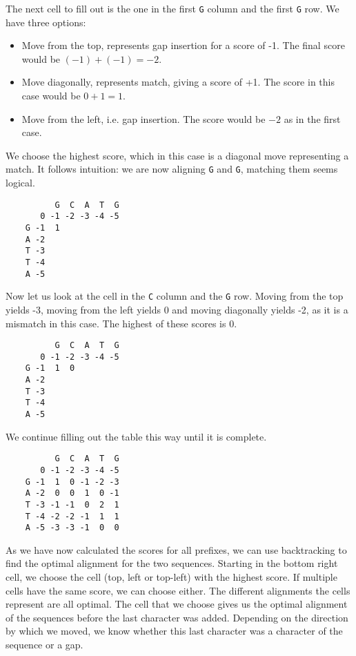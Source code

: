 The next cell to fill out is the one in the first \verb|G| column and the first \verb|G| row. We have three options:

\begin{itemize}
    \item Move from the top, represents gap insertion for a score of -1. The final score would be $(-1) + (-1) = -2$.
    \item Move diagonally, represents match, giving a score of +1. The score in this case would be $0 + 1 = 1$.
    \item Move from the left, i.e. gap insertion. The score would be $-2$ as in the first case.
\end{itemize}

We choose the highest score, which in this case is a diagonal move representing a match. It follows intuition: we are now aligning
\verb|G| and \verb|G|, matching them seems logical.

\begin{verbatim}
          G  C  A  T  G
       0 -1 -2 -3 -4 -5
    G -1  1
    A -2
    T -3
    T -4
    A -5
\end{verbatim}

Now let us look at the cell in the \verb|C| column and the \verb|G| row. Moving from the top yields -3, moving from the left yields
0 and moving diagonally yields -2, as it is a mismatch in this case. The highest of these scores is 0.

\begin{verbatim}
          G  C  A  T  G
       0 -1 -2 -3 -4 -5
    G -1  1  0
    A -2
    T -3
    T -4
    A -5
\end{verbatim}

We continue filling out the table this way until it is complete.

\begin{verbatim}
          G  C  A  T  G
       0 -1 -2 -3 -4 -5
    G -1  1  0 -1 -2 -3
    A -2  0  0  1  0 -1
    T -3 -1 -1  0  2  1
    T -4 -2 -2 -1  1  1
    A -5 -3 -3 -1  0  0
\end{verbatim}

As we have now calculated the scores for all prefixes, we can use backtracking to find the optimal alignment for the two sequences.
Starting in the bottom right cell, we choose the cell (top, left or top-left) with the highest score. If multiple cells have the same score, we can 
choose either. The different alignments the cells represent are all optimal. The cell that we choose gives us the optimal alignment
of the sequences before the last character was added. Depending on the direction by which we moved, we know whether this last character
was a character of the sequence or a gap.

